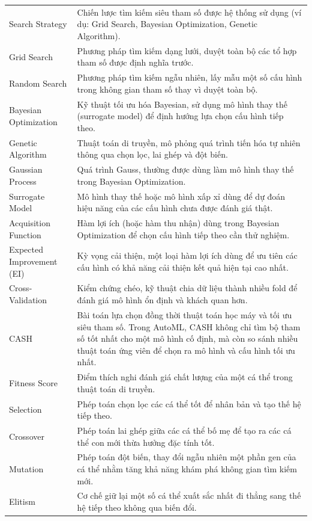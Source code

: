 \documentclass[12pt,a4paper]{article}
\begin{document}
\begin{longtable}{p{} p{}}
Search Strategy & Chiến lược tìm kiếm siêu tham số được hệ thống sử dụng (ví dụ: Grid Search, Bayesian Optimization, Genetic Algorithm). \\
Grid Search & Phương pháp tìm kiếm dạng lưới, duyệt toàn bộ các tổ hợp tham số được định nghĩa trước. \\
Random Search & Phương pháp tìm kiếm ngẫu nhiên, lấy mẫu một số cấu hình trong không gian tham số thay vì duyệt toàn bộ. \\
Bayesian Optimization & Kỹ thuật tối ưu hóa Bayesian, sử dụng mô hình thay thế (surrogate model) để định hướng lựa chọn cấu hình tiếp theo. \\
Genetic Algorithm & Thuật toán di truyền, mô phỏng quá trình tiến hóa tự nhiên thông qua chọn lọc, lai ghép và đột biến. \\
Gaussian Process & Quá trình Gauss, thường được dùng làm mô hình thay thế trong Bayesian Optimization. \\
Surrogate Model & Mô hình thay thế hoặc mô hình xấp xỉ dùng để dự đoán hiệu năng của các cấu hình chưa được đánh giá thật. \\
Acquisition Function & Hàm lợi ích (hoặc hàm thu nhận) dùng trong Bayesian Optimization để chọn cấu hình tiếp theo cần thử nghiệm. \\
Expected Improvement (EI) & Kỳ vọng cải thiện, một loại hàm lợi ích dùng để ưu tiên các cấu hình có khả năng cải thiện kết quả hiện tại cao nhất. \\
Cross-Validation & Kiểm chứng chéo, kỹ thuật chia dữ liệu thành nhiều fold để đánh giá mô hình ổn định và khách quan hơn. \\
CASH & Bài toán lựa chọn đồng thời thuật toán học máy và tối ưu siêu tham số. Trong AutoML, CASH không chỉ tìm bộ tham số tốt nhất cho một mô hình cố định, mà còn so sánh nhiều thuật toán ứng viên để chọn ra mô hình và cấu hình tối ưu nhất. \\
Fitness Score & Điểm thích nghi đánh giá chất lượng của một cá thể trong thuật toán di truyền. \\
Selection & Phép toán chọn lọc các cá thể tốt để nhân bản và tạo thế hệ tiếp theo. \\
Crossover & Phép toán lai ghép giữa các cá thể bố mẹ để tạo ra các cá thể con mới thừa hưởng đặc tính tốt. \\
Mutation & Phép toán đột biến, thay đổi ngẫu nhiên một phần gen của cá thể nhằm tăng khả năng khám phá không gian tìm kiếm mới. \\
Elitism & Cơ chế giữ lại một số cá thể xuất sắc nhất đi thẳng sang thế hệ tiếp theo không qua biến đổi. \\

\end{longtable}
\end{document}
